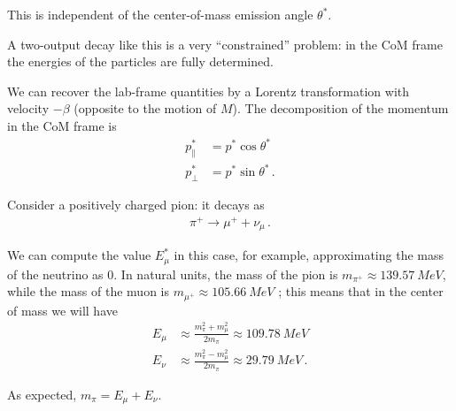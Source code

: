 \documentclass[main.tex]{subfiles}
\begin{document}
This is independent of the center-of-mass emission angle \(\theta^{*}\). 

A two-output decay like this is a very ``constrained'' problem: in the CoM frame the energies of the particles are fully determined.

We can recover the lab-frame quantities by a Lorentz transformation with velocity \(-\beta \) (opposite to the motion of \(M\)). 
The decomposition of the momentum in the CoM frame is 
%
\begin{align}
p^{*}_{\parallel} &= p^{*} \cos \theta^{*} \\
p^{*}_{\perp} &= p^{*} \sin \theta^{*}
\,.
\end{align}

Consider a positively charged pion: it decays as 
%
\begin{align}
\pi^{+} \to \mu^{+} + \nu_{\mu}
\,.
\end{align}

We can compute the value \(E^{*}_{\mu }\) in this case, for example, approximating the mass of the neutrino as 0. 
In natural units, the mass of the pion is \(m_{\pi^{+}} \approx \SI{139.57}{MeV}\), while the mass of the muon is \(m_{\mu^{+}} \approx \SI{105.66}{MeV}\) \cite{groupReviewParticlePhysics2020}; this means that in the center of mass we will have 
%
\begin{align}
E_{\mu } &\approx \frac{m_\pi^2 + m_\mu^2}{2 m_\pi } \approx \SI{109.78}{MeV}  \\
E_\nu &\approx \frac{m_\pi^2 - m_\mu^2}{2 m_\pi} \approx \SI{29.79}{MeV}
\,.
\end{align}

As expected, \(m_\pi = E_\mu +E_\nu \). 
\end{document}
